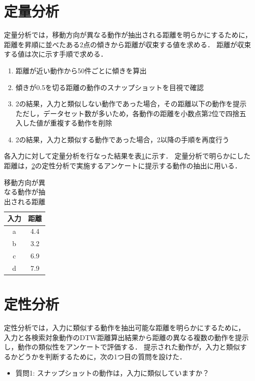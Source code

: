 \documentclass[11pt]{jreport}
\begin{document}
\section{定量分析}
定量分析では，移動方向が異なる動作が抽出される距離を明らかにするために，
距離を昇順に並べたある2点の傾きから距離が収束する値を求める．
距離が収束する値は次に示す手順で求める．

\begin{enumerate}
    \item 距離が近い動作から50件ごとに傾きを算出
    \item 傾きが0.5を切る距離の動作のスナップショットを目視で確認
    \item 2の結果，入力と類似しない動作であった場合，その距離以下の動作を提示
    ただし，データセット数が多いため，各動作の距離を小数点第2位で四捨五入した値が重複する動作を削除
    \item 2の結果，入力と類似する動作であった場合，2以降の手順を再度行う
\end{enumerate}

各入力に対して定量分析を行なった結果を表\ref{quantitativeresult}に示す．
定量分析で明らかにした距離は，\ref{teisei}の定性分析で実施するアンケートに提示する動作の抽出に用いる．
        
\begin{table}[H]
    \caption{移動方向が異なる動作が抽出される距離}
    \label{quantitativeresult}
    \centering
    \begin{tabular}{c|c}
    \hline
    入力 & 距離 \\
    \hline \hline
    a & 4.4 \\
    \hline
    b & 3.2 \\
    \hline
    c & 6.9 \\
    \hline
    d & 7.9 \\
    \hline
    \end{tabular}
\end{table}


\section{定性分析}
\label{teisei}
定性分析では，入力に類似する動作を抽出可能な距離を明らかにするために，
入力と各検索対象動作のDTW距離算出結果から距離の異なる複数の動作を提示し，動作の類似性をアンケートで評価する．
提示された動作が，入力と類似するかどうかを判断するために，次の1つ目の質問を設けた．

\begin{itemize}
    \item 質問1: スナップショットの動作は，入力に類似していますか？
\end{itemize}
\end{document}
